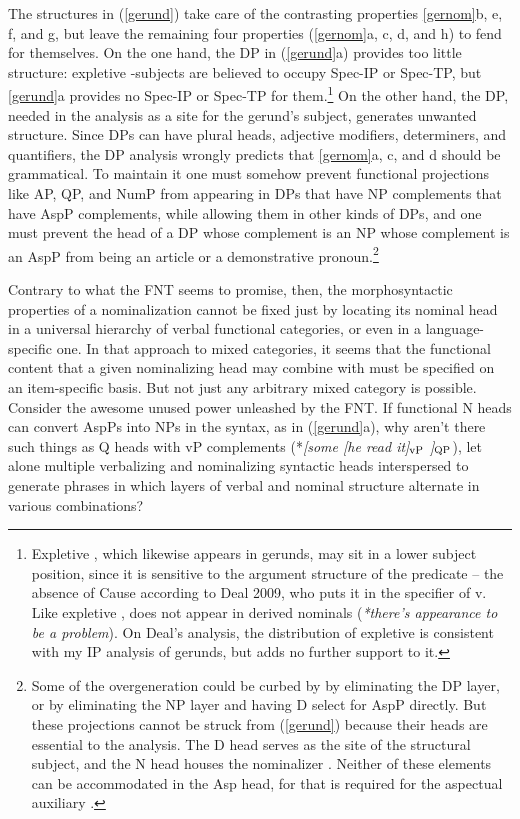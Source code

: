 \documentclass[output=paper,
modfonts
]{LSP/langsci}
\newcommand{\rf}[1]{(\ref{#1})}
\newcommand{\rfa}[2]{(\ref{#1}{#2})}
\def\trf#1{$_{\textrm{\scriptsize{#1}}}$}
\begin{document}
The structures in \rf{gerund} take care of the contrasting properties \cref{gernom}{b}, {e}, {f}, and {g}, but leave the remaining four properties
(\cref{gernom}{a}, {c}, {d}, and {h}) to fend for
themselves.  On the one hand, the DP in \rfa{gerund}{a} provides too little structure:
expletive -subjects are believed to occupy Spec-IP or Spec-TP, but \cref{gerund}{a}
provides no Spec-IP or Spec-TP for them.\footnote{Expletive , which likewise
  appears in gerunds, may sit in a lower subject position, since it is sensitive to the
  argument structure of the predicate – the absence of Cause according to Deal 2009, who puts
  it in the specifier of v.  Like expletive ,  does not appear in
  derived nominals (\textit{*there's appearance to be a problem}).  On Deal's analysis, the
  distribution of expletive  is consistent with my IP analysis of gerunds, but
  adds no further support to it.} On the other hand, the DP, needed in the analysis as a site
for the gerund's subject, generates unwanted structure.  Since DPs can have plural heads,
adjective modifiers, determiners, and quantifiers, the DP analysis wrongly predicts that
\cref{gernom}{a}, {c}, and {d} should be grammatical.  To maintain it
one must somehow prevent functional projections like AP, QP, and NumP from appearing in DPs
that have NP complements that have AspP complements, while allowing them in other kinds of DPs,
and one must prevent the head of a DP whose complement is an NP whose complement is an AspP
from being an article or a demonstrative pronoun.\footnote{Some of the overgeneration could be
  curbed by by eliminating the DP layer, or by eliminating the NP layer and having D select for
  AspP directly. But these projections cannot be struck from \rf{gerund} because their heads
  are essential to the analysis.  The D head serves as the site of the structural subject, and
  the N head houses the nominalizer .  Neither of these elements can be
  accommodated in the Asp head, for that is required for the aspectual auxiliary
  .}

Contrary to what the FNT seems to promise, then, the morphosyntactic properties of a
nominalization cannot be fixed just by locating its nominal head in a universal hierarchy of
verbal functional categories, or even in a language-specific one.  In that approach to mixed
categories, it seems that the functional content that a given nominalizing head may combine
with must be specified on an item-specific basis.  But not just any arbitrary mixed category is
possible.  Consider the awesome unused power unleashed by the FNT.  If functional N heads can
convert AspPs into NPs in the syntax, as in \rfa{gerund}{a}, why aren't there such things as Q
heads with vP complements (*\textit{[some [he read it]\trf{vP} ]\trf{QP}}), let alone
multiple verbalizing and nominalizing syntactic heads interspersed to generate phrases in which
layers of verbal and nominal structure alternate in various combinations?
\end{document}
